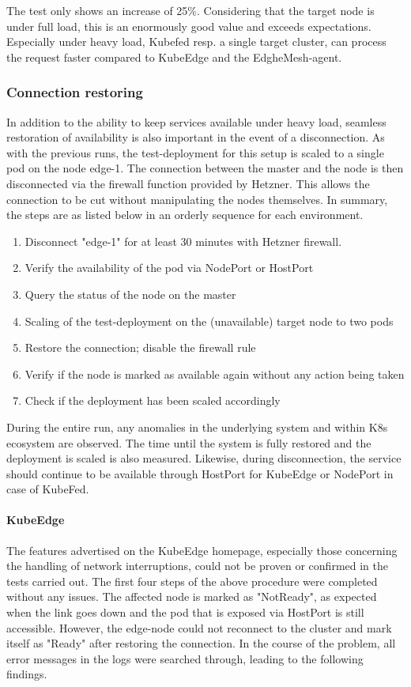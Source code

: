 \documentclass[MIC,Master,english]{twbook}%
\begin{document}
The test only shows an increase of 25\%. Considering that the target node is under full load, this is an enormously good value and exceeds expectations. Especially under heavy load, Kubefed resp. a single target cluster, can process the request faster compared to KubeEdge and the EdgheMesh-agent.

\subsubsection{Connection restoring}
In addition to the ability to keep services available under heavy load, seamless restoration of availability is also important in the event of a disconnection. As with the previous runs, the test-deployment for this setup is scaled to a single pod on the node edge-1. The connection between the master and the node is then disconnected via the firewall function provided by Hetzner. This allows the connection to be cut without manipulating the nodes themselves. In summary, the steps are as listed below in an orderly sequence for each environment.
\begin{enumerate}
    \itemsep0em
    \item Disconnect "edge-1" for at least 30 minutes with Hetzner firewall.
    \item Verify the availability of the pod via NodePort or HostPort
    \item Query the status of the node on the master
    \item Scaling of the test-deployment on the (unavailable) target node to two pods
    \item Restore the connection; disable the firewall rule
    \item Verify if the node is marked as available again without any action being taken
    \item Check if the deployment has been scaled accordingly
\end{enumerate}

During the entire run, any anomalies in the underlying system and within \ac{K8s} ecosystem are observed. The time until the system is fully restored and the deployment is scaled is also measured. Likewise, during disconnection, the service should continue to be available through HostPort for KubeEdge or NodePort in case of KubeFed. 

\paragraph{KubeEdge} The features advertised on the KubeEdge homepage, especially those concerning the handling of network interruptions, could not be proven or confirmed in the tests carried out. The first four steps of the above procedure were completed without any issues. The affected node is marked as "NotReady", as expected when the link goes down and the pod that is exposed via HostPort is still accessible. However, the edge-node could not reconnect to the cluster and mark itself as "Ready" after restoring the connection. In the course of the problem, all error messages in the logs were searched through, leading to the following findings. \par
\end{document}

